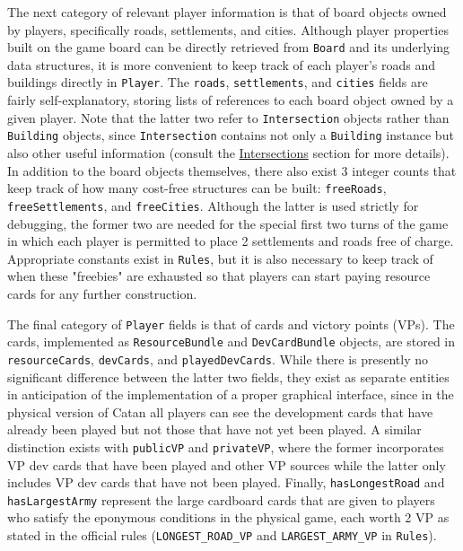 \documentclass[pageno]{jpaper}
\begin{document}
\begin{doublespacing}
The next category of relevant player information is that of board objects owned by players, specifically roads, settlements, and cities. Although player properties built on the game board can be directly retrieved from \lstinline$Board$ and its underlying data structures, it is more convenient to keep track of each player's roads and buildings directly in \lstinline$Player$. The \lstinline$roads$, \lstinline$settlements$, and \lstinline$cities$ fields are fairly self-explanatory, storing lists of references to each board object owned by a given player. Note that the latter two refer to \lstinline$Intersection$ objects rather than \lstinline$Building$ objects, since \lstinline$Intersection$ contains not only a \lstinline$Building$ instance but also other useful information (consult the \hyperlink{sec:intersections}{Intersections} section for more details). In addition to the board objects themselves, there also exist 3 integer counts that keep track of how many cost-free structures can be built: \lstinline$freeRoads$, \lstinline$freeSettlements$, and \lstinline$freeCities$. Although the latter is used strictly for debugging, the former two are needed for the special first two turns of the game in which each player is permitted to place 2 settlements and roads free of charge. Appropriate constants exist in \lstinline$Rules$, but it is also necessary to keep track of when these "freebies" are exhausted so that players can start paying resource cards for any further construction.
    
The final category of \lstinline$Player$ fields is that of cards and victory points (VPs). The cards, implemented as \lstinline$ResourceBundle$ and \lstinline$DevCardBundle$ objects, are stored in \lstinline$resourceCards$, \lstinline$devCards$, and \lstinline$playedDevCards$. While there is presently no significant difference between the latter two fields, they exist as separate entities in anticipation of the implementation of a proper graphical interface, since in the physical version of Catan all players can see the development cards that have already been played but not those that have not yet been played. A similar distinction exists with \lstinline$publicVP$ and \lstinline$privateVP$, where the former incorporates VP dev cards that have been played and other VP sources while the latter only includes VP dev cards that have not been played. Finally, \lstinline$hasLongestRoad$ and \lstinline$hasLargestArmy$ represent the large cardboard cards that are given to players who satisfy the eponymous conditions in the physical game, each worth 2 VP as stated in the official rules (\lstinline$LONGEST_ROAD_VP$ and \lstinline$LARGEST_ARMY_VP$ in \lstinline$Rules$).


\end{doublespacing}
\end{document}

